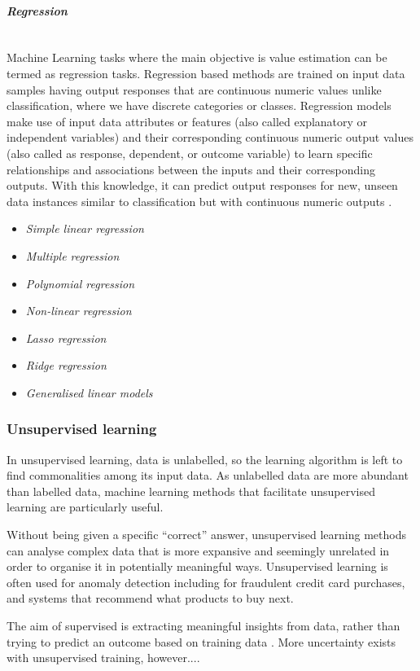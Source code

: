 \documentclass[12pt,a4paper]{article}
\newcommand{\myparagraph}[1]{\paragraph{#1}\mbox{}\\}
\begin{document}
\myparagraph{\textit{Regression}}
Machine Learning tasks where the main objective is value estimation can be termed as regression tasks.
Regression based methods are trained on input data samples having output responses that are continuous
numeric values unlike classification, where we have discrete categories or classes. Regression models
make use of input data attributes or features (also called explanatory or independent variables) and their
corresponding continuous numeric output values (also called as response, dependent, or outcome variable)
to learn specific relationships and associations between the inputs and their corresponding outputs. With
this knowledge, it can predict output responses for new, unseen data instances similar to classification but
with continuous numeric outputs \cite{Kononenko2007}.

\begin{itemize}
    \item \textit{Simple linear regression}
    \item \textit{Multiple regression}
    \item \textit{Polynomial regression}
    \item \textit{Non-linear regression}
    \item \textit{Lasso regression}
    \item \textit{Ridge regression}
    \item \textit{Generalised linear models}
\end{itemize}

\subsubsection{Unsupervised learning}
In unsupervised learning, data is unlabelled, so the learning algorithm is left to find commonalities among its input data. As unlabelled data are more abundant than labelled data, machine learning methods that facilitate unsupervised learning are particularly useful.

Without being given a specific “correct” answer, unsupervised learning methods can analyse complex data that is more expansive and seemingly unrelated in order to organise it in potentially meaningful ways. Unsupervised learning is often used for anomaly detection including for fraudulent credit card purchases, and systems that recommend what products to buy next.

The aim of supervised is extracting meaningful insights from data, rather than trying to predict an outcome based on training data \cite{Kononenko2007}. More uncertainty exists with unsupervised training, however....
\end{document}
